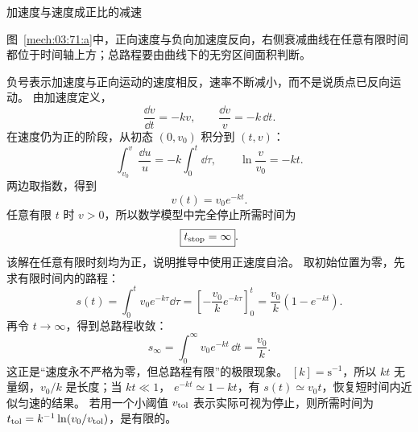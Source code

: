 {\begin{origexamplebox}{加速度与速度成正比的减速}
\begin{qualityfigure}
\label{mech:03:71:q}
\end{qualityfigure}
\end{origexamplebox}
\begin{xesolution}
\begin{qualityfigure}
\label{mech:03:71:a}
\end{qualityfigure}
图~\ref{mech:03:71:a}中，正向速度与负向加速度反向，右侧衰减曲线在任意有限时间都位于时间轴上方；总路程要由曲线下的无穷区间面积判断。

负号表示加速度与正向运动的速度相反，速率不断减小，而不是说质点已反向运动。
由加速度定义，
\[
 \frac{\dd v}{\dd t}=-kv,\qquad \frac{\dd v}{v}=-k\,\dd t.
\]
在速度仍为正的阶段，从初态 $(0,v_0)$ 积分到 $(t,v)$：
\[
 \int_{v_0}^{v}\frac{\dd u}{u}=-k\int_0^t\dd\tau,
 \qquad \ln\frac{v}{v_0}=-kt.
\]
两边取指数，得到
\[
 \boxed{v(t)=v_0e^{-kt}}.
\]
任意有限 $t$ 时 $v>0$，所以数学模型中完全停止所需时间为
\[
 \boxed{t_{\rm stop}=\infty}.
\]
该解在任意有限时刻均为正，说明推导中使用正速度自洽。
取初始位置为零，先求有限时间内的路程：
\[
 s(t)=\int_0^t v_0e^{-k\tau}\dd\tau
 =\left[-\frac{v_0}{k}e^{-k\tau}\right]_0^t
 =\frac{v_0}{k}(1-e^{-kt}).
\]
再令 $t\to\infty$，得到总路程收敛：
\[
 \boxed{s_\infty=\int_0^\infty v_0e^{-kt}\,\dd t=\frac{v_0}{k}}.
\]
这正是“速度永不严格为零，但总路程有限”的极限现象。
$[k]=\mathrm{s^{-1}}$，所以 $kt$ 无量纲，$v_0/k$ 是长度；当 $kt\ll1$，
$e^{-kt}\simeq1-kt$，有 $s(t)\simeq v_0t$，恢复短时间内近似匀速的结果。
若用一个小阈值 $v_{\rm tol}$ 表示实际可视为停止，则所需时间为
$t_{\rm tol}=k^{-1}\ln(v_0/v_{\rm tol})$，是有限的。
\end{xesolution}

}
